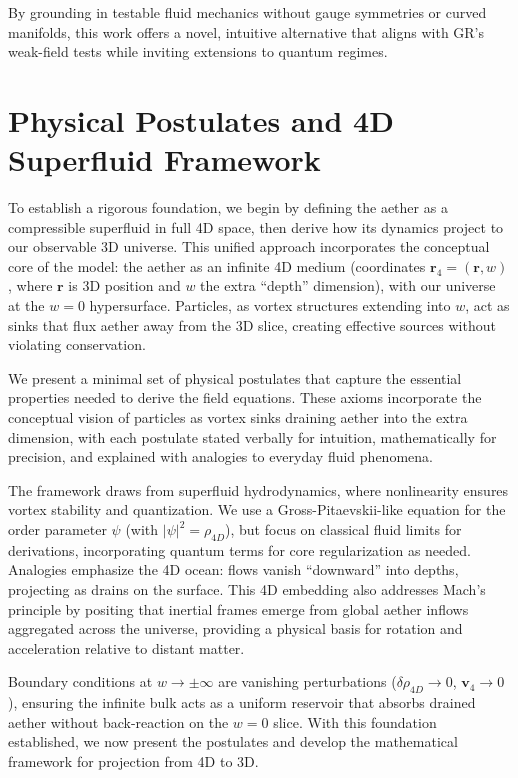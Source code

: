 \documentclass{article}
\begin{document}
By grounding in testable fluid mechanics without gauge symmetries or curved manifolds, this work offers a novel, intuitive alternative that aligns with GR's weak-field tests while inviting extensions to quantum regimes.

\section{Physical Postulates and 4D Superfluid Framework}

To establish a rigorous foundation, we begin by defining the aether as a compressible superfluid in full 4D space, then derive how its dynamics project to our observable 3D universe. This unified approach incorporates the conceptual core of the model: the aether as an infinite 4D medium (coordinates $\mathbf{r}_4 = (\mathbf{r}, w)$, where $\mathbf{r}$ is 3D position and $w$ the extra ``depth'' dimension), with our universe at the $w=0$ hypersurface. Particles, as vortex structures extending into $w$, act as sinks that flux aether away from the 3D slice, creating effective sources without violating conservation.

We present a minimal set of physical postulates that capture the essential properties needed to derive the field equations. These axioms incorporate the conceptual vision of particles as vortex sinks draining aether into the extra dimension, with each postulate stated verbally for intuition, mathematically for precision, and explained with analogies to everyday fluid phenomena.

The framework draws from superfluid hydrodynamics, where nonlinearity ensures vortex stability and quantization. We use a Gross-Pitaevskii-like equation for the order parameter $\psi$ (with $|\psi|^2 = \rho_{4D}$), but focus on classical fluid limits for derivations, incorporating quantum terms for core regularization as needed. Analogies emphasize the 4D ocean: flows vanish ``downward'' into depths, projecting as drains on the surface. This 4D embedding also addresses Mach's principle by positing that inertial frames emerge from global aether inflows aggregated across the universe, providing a physical basis for rotation and acceleration relative to distant matter.

Boundary conditions at $w \to \pm \infty$ are vanishing perturbations ($\delta \rho_{4D} \to 0$, $\mathbf{v}_4 \to 0$), ensuring the infinite bulk acts as a uniform reservoir that absorbs drained aether without back-reaction on the $w=0$ slice. With this foundation established, we now present the postulates and develop the mathematical framework for projection from 4D to 3D.
\end{document}
